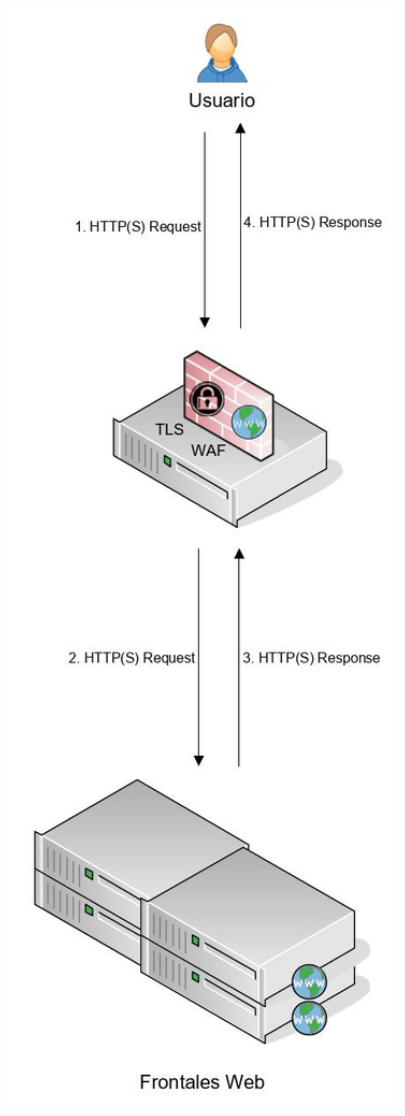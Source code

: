 \begin{enumerate}
\begin{itemize}
\begin{center}
          \includegraphics[width=0.8\textwidth]{fig/UseCase1}

\end{center}
\end{itemize}
\end{enumerate}
